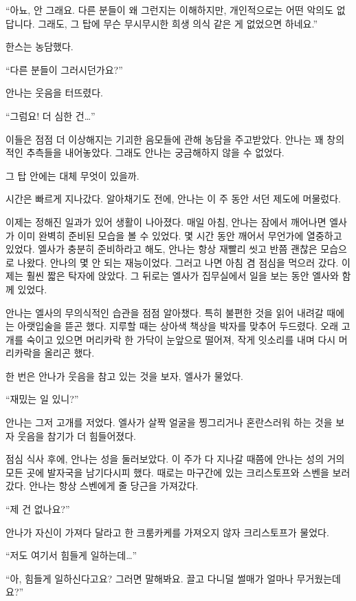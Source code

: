 ``아뇨, 안 그래요. 다른 분들이 왜 그런지는 이해하지만, 개인적으로는 어떤 악의도 없답니다. 그래도, 그 탑에 무슨 무시무시한 희생 의식 같은 게 없었으면 하네요.''

한스는 농담했다.

``다른 분들이 그러시던가요?''

안나는 웃음을 터뜨렸다.

``그럼요! 더 심한 건\ldots''

이들은 점점 더 이상해지는 기괴한 음모들에 관해 농담을 주고받았다. 안나는 꽤 창의적인 추측들을 내어놓았다. 그래도 안나는 궁금해하지 않을 수 없었다.

그 탑 안에는 대체 무엇이 있을까.

\textbreak

시간은 빠르게 지나갔다. 알아채기도 전에, 안나는 이 주 동안 서던 제도에 머물렀다.

이제는 정해진 일과가 있어 생활이 나아졌다. 매일 아침, 안나는 잠에서 깨어나면 엘사가 이미 완벽히 준비된 모습을 볼 수 있었다. 몇 시간 동안 깨어서 무언가에 열중하고 있었다. 엘사가 충분히 준비하라고 해도, 안나는 항상 재빨리 씻고 반쯤 괜찮은 모습으로 나왔다. 안나의 몇 안 되는 재능이었다. 그러고 나면 아침 겸 점심을 먹으러 갔다. 이제는 훨씬 짧은 탁자에 앉았다. 그 뒤로는 엘사가 집무실에서 일을 보는 동안 엘사와 함께 있었다.

안나는 엘사의 무의식적인 습관을 점점 알아챘다. 특히 불편한 것을 읽어 내려갈 때에는 아랫입술을 뜯곤 했다. 지루할 때는 상아색 책상을 박자를 맞추어 두드렸다. 오래 고개를 숙이고 있으면 머리카락 한 가닥이 눈앞으로 떨어져, 작게 잇소리를 내며 다시 머리카락을 올리곤 했다.

한 번은 안나가 웃음을 참고 있는 것을 보자, 엘사가 물었다.

``재밌는 일 있니?''

안나는 그저 고개를 저었다. 엘사가 살짝 얼굴을 찡그리거나 혼란스러워 하는 것을 보자 웃음을 참기가 더 힘들어졌다.

점심 식사 후에, 안나는 성을 둘러보았다. 이 주가 다 지나갈 때쯤에 안나는 성의 거의 모든 곳에 발자국을 남기다시피 했다. 때로는 마구간에 있는 크리스토프와 스벤을 보러 갔다. 안나는 항상 스벤에게 줄 당근을 가져갔다.

``제 건 없나요?''

안나가 자신이 가져다 달라고 한 크룸카케를 가져오지 않자 크리스토프가 물었다.

``저도 여기서 힘들게 일하는데\ldots''

``아, 힘들게 일하신다고요? 그러면 말해봐요. 끌고 다니덜 썰매가 얼마나 무거웠는데요?''

